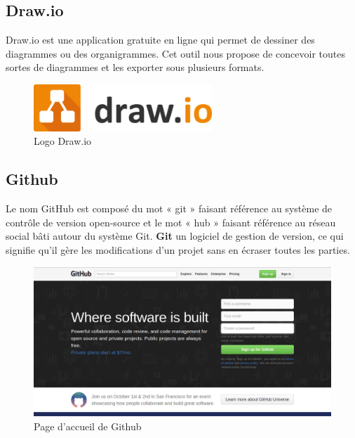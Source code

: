 \documentclass[11pt,a4paper,oneside]{book}
\begin{document}
					
					

					
					\subsection{Draw.io}
					Draw.io est une application gratuite en ligne qui permet de dessiner des diagrammes ou des organigrammes. Cet outil nous propose de concevoir toutes sortes de diagrammes et les exporter sous plusieurs formats.
					\begin{figure}[H]
						\centering
						\includegraphics[width=0.6\textwidth]{Images/ch4/drawio}
						\caption{Logo Draw.io}
						\label{fig:draw}
					\end{figure}
					\subsection{Github}
					Le nom GitHub est composé du mot « git » faisant référence au système de contrôle de version open-source et le mot « hub » faisant référence au réseau social bâti autour du système Git.
					\textbf{Git} un logiciel de gestion de version, ce qui signifie qu’il gère les modifications d’un projet sans en écraser toutes les parties.
					\begin{figure}[H]
						\centering
						\includegraphics[width=1\linewidth]{Images/ch4/github}
						\caption{Page d'accueil de Github}
						\label{fig:github}
					\end{figure}
\end{document}
